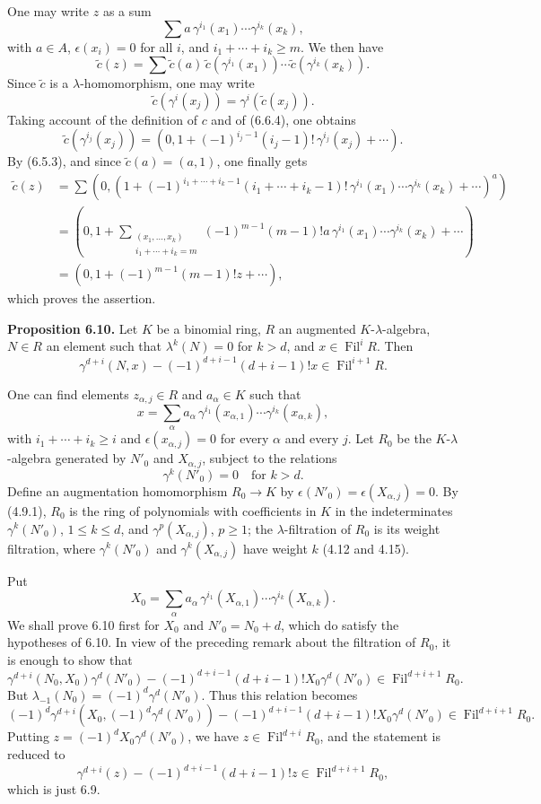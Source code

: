 \documentclass[11pt]{article}
\newcommand{\Fil}{\operatorname{Fil}}
\begin{document}
One may write \(z\) as a sum
\[
  \sum a\,\gamma^{i_1}(x_1)\cdots\gamma^{i_k}(x_k),
\]
with \(a\in A\), \(\epsilon(x_i)=0\) for all \(i\), and \(i_1+\cdots+i_k\ge m\). We then have
\[
  \widetilde c(z)=
  \sum \widetilde c(a)\,
        \widetilde c(\gamma^{i_1}(x_1))\cdots
        \widetilde c(\gamma^{i_k}(x_k)).
\]
Since \(\widetilde c\) is a \(\lambda\)-homomorphism, one may write
\[
  \widetilde c(\gamma^i(x_j))=\gamma^i(\widetilde c(x_j)).
\]
Taking account of the definition of \(c\) and of (6.6.4), one obtains
\[
  \widetilde c(\gamma^{i_j}(x_j))
  =
  \left(0,1+(-1)^{i_j-1}(i_j-1)!\,\gamma^{i_j}(x_j)+\cdots\right).
\]
By (6.5.3), and since \(\widetilde c(a)=(a,1)\), one finally gets
\[
\begin{aligned}
\widetilde c(z)
&=\sum
\left(0,\left(1+
(-1)^{i_1+\cdots+i_k-1}
(i_1+\cdots+i_k-1)!
\,\gamma^{i_1}(x_1)\cdots\gamma^{i_k}(x_k)
+\cdots\right)^a\right)\\
&=
\left(0,1+
\sum_{\substack{(x_1,\ldots,x_k)\\ i_1+\cdots+i_k=m}}
(-1)^{m-1}(m-1)!a\,\gamma^{i_1}(x_1)\cdots\gamma^{i_k}(x_k)
+\cdots\right)\\
&=
(0,1+(-1)^{m-1}(m-1)!z+\cdots),
\end{aligned}
\]
which proves the assertion.

\textbf{Proposition 6.10.} Let \(K\) be a binomial ring, \(R\) an augmented \(K\)-\(\lambda\)-algebra, \(N\in R\) an element such that \(\lambda^k(N)=0\) for \(k>d\), and \(x\in\Fil^iR\). Then
\[
  \gamma^{d+i}(N,x)-(-1)^{d+i-1}(d+i-1)!x\in\Fil^{i+1}R.
\]

One can find elements \(z_{\alpha,j}\in R\) and \(a_\alpha\in K\) such that
\[
  x=\sum_\alpha a_\alpha\,
       \gamma^{i_1}(x_{\alpha,1})\cdots
       \gamma^{i_k}(x_{\alpha,k}),
\]
with \(i_1+\cdots+i_k\ge i\) and \(\epsilon(x_{\alpha,j})=0\) for every \(\alpha\) and every \(j\). Let \(R_0\) be the \(K\)-\(\lambda\)-algebra generated by \(N'_0\) and \(X_{\alpha,j}\), subject to the relations
\[
  \gamma^k(N'_0)=0\quad\text{for }k>d.
\]
Define an augmentation homomorphism \(R_0\to K\) by \(\epsilon(N'_0)=\epsilon(X_{\alpha,j})=0\). By (4.9.1), \(R_0\) is the ring of polynomials with coefficients in \(K\) in the indeterminates \(\gamma^k(N'_0)\), \(1\le k\le d\), and \(\gamma^p(X_{\alpha,j})\), \(p\ge1\); the \(\lambda\)-filtration of \(R_0\) is its weight filtration, where \(\gamma^k(N'_0)\) and \(\gamma^k(X_{\alpha,j})\) have weight \(k\) (4.12 and 4.15).

Put
\[
  X_0=\sum_\alpha a_\alpha\,
       \gamma^{i_1}(X_{\alpha,1})\cdots
       \gamma^{i_k}(X_{\alpha,k}).
\]
We shall prove 6.10 first for \(X_0\) and \(N'_0=N_0+d\), which do satisfy the hypotheses of 6.10. In view of the preceding remark about the filtration of \(R_0\), it is enough to show that
\[
  \gamma^{d+i}(N_0,X_0)\gamma^d(N'_0)
  -
  (-1)^{d+i-1}(d+i-1)!X_0\gamma^d(N'_0)
  \in\Fil^{d+i+1}R_0 .
\]
But \(\lambda_{-1}(N_0)=(-1)^d\gamma^d(N'_0)\). Thus this relation becomes
\[
  (-1)^d\gamma^{d+i}(X_0,(-1)^d\gamma^d(N'_0))
  -
  (-1)^{d+i-1}(d+i-1)!X_0\gamma^d(N'_0)
  \in\Fil^{d+i+1}R_0 .
\]
Putting \(z=(-1)^dX_0\gamma^d(N'_0)\), we have \(z\in\Fil^{d+i}R_0\), and the statement is reduced to
\[
  \gamma^{d+i}(z)-(-1)^{d+i-1}(d+i-1)!z\in\Fil^{d+i+1}R_0,
\]
which is just 6.9.
\end{document}
